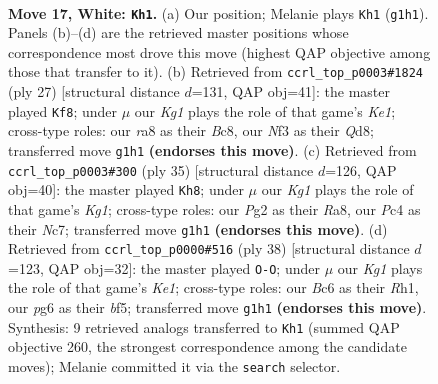 \documentclass[11pt]{article}
\begin{document}
\clearpage

\begin{figure}[p]\centering
\begin{subfigure}{0.46\textwidth}\centering
\resizebox{\linewidth}{!}{%
\newchessgame
\chessboard[
  setfen={r1b2rk1/2p2p2/2B3p1/p3p2p/2P3nP/3q1N2/PP1N1bP1/R1BQR1K1 w - - 0 17},
  showmover=false,
  pgfstyle=straightmove, color=movearrow, markmove={g1-h1}
]}
\caption{}
\end{subfigure}\hfill
\begin{subfigure}{0.46\textwidth}\centering
\resizebox{\linewidth}{!}{%
\newchessgame
\chessboard[
  setfen={r1bqk2r/ppp3pp/2nP4/b3n2Q/B7/2p5/P4PPP/RNB2RK1 b - - 4 14},
  showmover=false,
  pgfstyle=straightmove, color=movearrow, markmove={e8-f8}
]}
\caption{}
\end{subfigure}
\\[4pt]
\begin{subfigure}{0.46\textwidth}\centering
\resizebox{\linewidth}{!}{%
\newchessgame
\chessboard[
  setfen={r2q1rk1/2n4p/2p1B1pb/ppNn4/3P4/4P3/Q4PPP/R1B2RK1 b - - 0 18},
  showmover=false,
  pgfstyle=straightmove, color=movearrow, markmove={g8-h8}
]}
\caption{}
\end{subfigure}\hfill
\begin{subfigure}{0.46\textwidth}\centering
\resizebox{\linewidth}{!}{%
\newchessgame
\chessboard[
  setfen={r3k2r/pp3p2/1bn4p/4qbp1/1PB5/P1N3P1/3QNPP1/2R1K2R w Kkq - 1 20},
  showmover=false,
  pgfstyle=straightmove, color=movearrow, markmove={e1-g1}
]}
\caption{}
\end{subfigure}
\caption{\textbf{Move 17, White: \texttt{Kh1}.} (a) Our position; Melanie plays \texttt{Kh1} (\texttt{g1h1}). Panels (b)--(d) are the retrieved master positions whose correspondence most drove this move (highest QAP objective among those that transfer to it). (b) Retrieved from \texttt{ccrl\_top\_p0003\#1824} (ply 27) [structural distance $d$=131, QAP obj=41]: the master played \texttt{Kf8}; under $\mu$ our \emph{Kg1} plays the role of that game's \emph{Ke1}; cross-type roles: our \emph{r}a8 as their \emph{B}c8, our \emph{N}f3 as their \emph{Q}d8; transferred move \texttt{g1h1} \textbf{(endorses this move)}. (c) Retrieved from \texttt{ccrl\_top\_p0003\#300} (ply 35) [structural distance $d$=126, QAP obj=40]: the master played \texttt{Kh8}; under $\mu$ our \emph{Kg1} plays the role of that game's \emph{Kg1}; cross-type roles: our \emph{P}g2 as their \emph{R}a8, our \emph{P}c4 as their \emph{N}c7; transferred move \texttt{g1h1} \textbf{(endorses this move)}. (d) Retrieved from \texttt{ccrl\_top\_p0000\#516} (ply 38) [structural distance $d$=123, QAP obj=32]: the master played \texttt{O-O}; under $\mu$ our \emph{Kg1} plays the role of that game's \emph{Ke1}; cross-type roles: our \emph{B}c6 as their \emph{R}h1, our \emph{p}g6 as their \emph{b}f5; transferred move \texttt{g1h1} \textbf{(endorses this move)}. Synthesis: 9 retrieved analogs transferred to \texttt{Kh1} (summed QAP objective 260, the strongest correspondence among the candidate moves); Melanie committed it via the \texttt{search} selector.}
\label{fig:thought-m32}
\end{figure}
\end{document}
